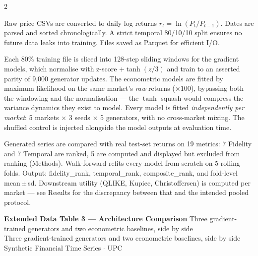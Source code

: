 \documentclass[10pt]{article}
\newcommand{\navybox}[2]{\begin{tcolorbox}[mybox={Navy}{LBg},title={#1}]#2\end{tcolorbox}}
\newcommand{\skybox}[2]{\begin{tcolorbox}[mybox={Sky}{BBg},title={#1}]#2\end{tcolorbox}}
\newcommand{\tealbox}[2]{\begin{tcolorbox}[mybox={Teal}{LBg},title={#1}]#2\end{tcolorbox}}
\newcommand{\pagehead}[2]{%
  \begin{tcolorbox}[enhanced,arc=0pt,outer arc=0pt,boxrule=0pt,
    colback=Navy,colframe=Navy,
    top=5pt,bottom=5pt,left=8pt,right=8pt,
    before skip=0pt,after skip=10pt]
  {\color{white}\large\bfseries #1}%
  \ifx\relax#2\relax\else\\[1pt]{\color{blue!30!white}\small #2}\fi
  \hfill{\color{blue!20!white}\footnotesize Synthetic Financial Time Series $\cdot$ UPC}
  \end{tcolorbox}}
\begin{document}
\vspace{6pt}
\begin{multicols}{2}
\small

\navybox{Stage 1 --- Data Preprocessing}{%
Raw price CSVs are converted to daily log returns $r_t = \ln(P_t/P_{t-1})$. Dates are parsed and sorted chronologically. A strict temporal 80/10/10 split ensures no future data leaks into training. Files saved as Parquet for efficient I/O.}

\skybox{Stage 2 --- Per-Market Fitting (Both Families)}{%
Each 80\% training file is sliced into 128-step sliding windows for the gradient models, which normalise with z-score $+\tanh(z/3)$ and train to an asserted parity of 9,000 generator updates. The econometric models are fitted by maximum likelihood on the same market's \emph{raw} returns ($\times100$), bypassing both the windowing and the normalisation --- the $\tanh$ squash would compress the variance dynamics they exist to model. Every model is fitted \emph{independently per market}: 5 markets $\times$ 3 seeds $\times$ 5 generators, with no cross-market mixing. The shuffled control is injected alongside the model outputs at evaluation time.}

\columnbreak

\tealbox{Stage 3 --- Evaluation}{%
Generated series are compared with real test-set returns on 19 metrics: 7 Fidelity and 7 Temporal are ranked, 5 are computed and displayed but excluded from ranking (Methods). Walk-forward refits every model from scratch on 5 rolling folds. Output: fidelity\_rank, temporal\_rank, composite\_rank, and fold-level mean\,$\pm$\,sd. Downstream utility (QLIKE, Kupiec, Christoffersen) is computed per market --- see Results for the discrepancy between that and the intended pooled protocol.}

\end{multicols}

\clearpage

\pagehead{Extended Data Table 3 --- Architecture Comparison}
         {Three gradient-trained generators and two econometric baselines, side by side}
\end{document}
